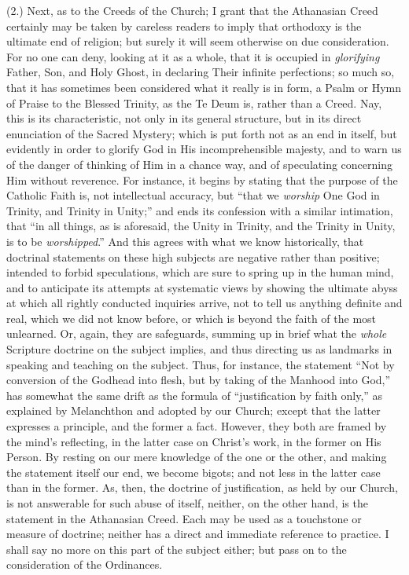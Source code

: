 (2.) Next, as to the Creeds of the Church; I grant that the
Athanasian Creed certainly may be taken by careless readers to imply
that orthodoxy is the ultimate end of religion; but surely it will
seem otherwise on due consideration. For no one can deny, looking at
it as a whole, that it is occupied in \emph{glorifying} Father, Son,
and Holy Ghost, in declaring Their infinite perfections; so much so,
that it has sometimes been considered what it really is in form,
a Psalm or Hymn of Praise to the Blessed Trinity, as the Te Deum is,
rather than a Creed. Nay, this is its characteristic, not only in its
general structure, but in its direct enunciation of the Sacred
Mystery; which is put forth not as an end in itself, but evidently in
order to glorify God in His incomprehensible majesty, and to warn us
of the danger of thinking of Him in a chance way, and of speculating
concerning Him without reverence. For instance, it begins by stating
that the purpose of the Catholic Faith is, not intellectual accuracy,
but ``that we \emph{worship} One God in Trinity, and Trinity in
Unity;'' and ends its confession with a similar intimation, that
``in all things, as is aforesaid, the Unity in Trinity, and the
Trinity in Unity, is to be \emph{worshipped}.'' And this agrees
with what we know historically, that doctrinal statements on these
high subjects are negative rather than positive; intended to forbid
speculations, which are sure to spring up in the human mind, and to
anticipate its attempts at systematic views by showing the ultimate
abyss at which all rightly conducted inquiries arrive, not to tell us
anything definite and real, which we did not know before, or which is
beyond the faith of the most unlearned. Or, again, they are
safeguards, summing up in brief what the \emph{whole} Scripture
doctrine on the subject implies, and thus directing us as landmarks in
speaking and teaching on the subject. Thus, for instance, the
statement ``Not by conversion of the Godhead into flesh, but by
taking of the Manhood into God,'' has somewhat the same drift as
the formula of ``justification by faith only,'' as explained
by Melanchthon and adopted by our Church; except that the latter expresses a principle, and the former a fact. However, they both are
framed by the mind's reflecting, in the latter case on Christ's work,
in the former on His Person. By resting on our mere knowledge of the
one or the other, and making the statement itself our end, we become
bigots; and not less in the latter case than in the former. As, then,
the doctrine of justification, as held by our Church, is not
answerable for such abuse of itself, neither, on the other hand, is
the statement in the Athanasian Creed. Each may be used as a
touchstone or measure of doctrine; neither has a direct and immediate
reference to practice. I shall say no more on this part of the subject
either; but pass on to the consideration of the Ordinances.

